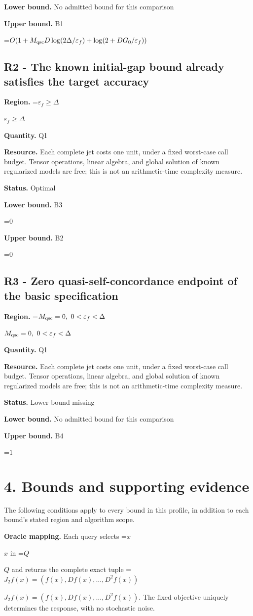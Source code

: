 \documentclass[10pt,a4paper]{article}
\newcommand{\AtlasMath}[1]{\par\begingroup\centering\setbox0=\hbox{$\displaystyle #1$}\ifdim\wd0>1.4\linewidth\typeout{ATLAS WIDE FORMULA: \the\wd0}\fi\ifdim\wd0>\linewidth\resizebox{\linewidth}{!}{\box0}\else\box0\fi\par\endgroup}
\newcommand{\AtlasInlineMath}[1]{\begingroup\setbox0=\hbox{$#1$}\ifdim\wd0>.4\linewidth\endgroup\AtlasMath{#1}\else\endgroup$#1$\fi}
\begin{document}
\textbf{Lower bound.} No admitted bound for this comparison

\textbf{Upper bound.} B1

\AtlasMath{O(1+M_{\rm qsc}D\log(2\Delta/\varepsilon_f)+\log(2+DG_0/\varepsilon_f))}
\subsection{R2 - The known initial-gap bound already satisfies the target accuracy}
\textbf{Region.} \AtlasInlineMath{\varepsilon_f\ge\Delta}

\textbf{Quantity.} Q1

\textbf{Resource.} Each complete jet costs one unit, under a fixed worst-case call budget. Tensor operations, linear algebra, and global solution of known regularized models are free; this is not an arithmetic-time complexity measure.

\textbf{Status.} Optimal

\textbf{Lower bound.} B3

\AtlasMath{0}
\textbf{Upper bound.} B2

\AtlasMath{0}
\subsection{R3 - Zero quasi-self-concordance endpoint of the basic specification}
\textbf{Region.} \AtlasInlineMath{M_{\rm qsc}=0,\ 0<\varepsilon_f<\Delta}

\textbf{Quantity.} Q1

\textbf{Resource.} Each complete jet costs one unit, under a fixed worst-case call budget. Tensor operations, linear algebra, and global solution of known regularized models are free; this is not an arithmetic-time complexity measure.

\textbf{Status.} Lower bound missing

\textbf{Lower bound.} No admitted bound for this comparison

\textbf{Upper bound.} B4

\AtlasMath{1}
\section{4. Bounds and supporting evidence}
The following conditions apply to every bound in this profile, in addition to each bound's stated region and algorithm scope.

\textbf{Oracle mapping.} Each query selects \AtlasInlineMath{x} in \AtlasInlineMath{Q} and returns the complete exact tuple \AtlasInlineMath{J_{2}f(x)=(f(x),Df(x),\ldots,D^{2}f(x))}. The fixed objective uniquely determines the response, with no stochastic noise.
\end{document}
